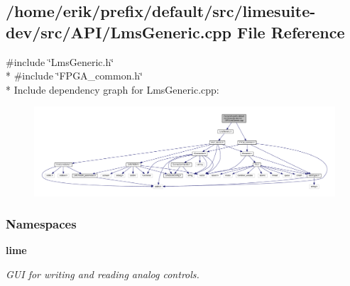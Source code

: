 \subsection{/home/erik/prefix/default/src/limesuite-\/dev/src/\+A\+P\+I/\+Lms\+Generic.cpp File Reference}
\label{LmsGeneric_8cpp}
{\ttfamily \#include \char`\"{}Lms\+Generic.\+h\char`\"{}}\\*
{\ttfamily \#include \char`\"{}F\+P\+G\+A\+\_\+common.\+h\char`\"{}}\\*
Include dependency graph for Lms\+Generic.\+cpp\+:
\nopagebreak
\begin{figure}[H]
\begin{center}
\leavevmode
\includegraphics[width=350pt]{d3/d78/LmsGeneric_8cpp__incl}
\end{center}
\end{figure}
\subsubsection*{Namespaces}
\begin{DoxyCompactItemize}
\item 
 {\bf lime}
\begin{DoxyCompactList}\small\item\em G\+UI for writing and reading analog controls. \end{DoxyCompactList}\end{DoxyCompactItemize}
